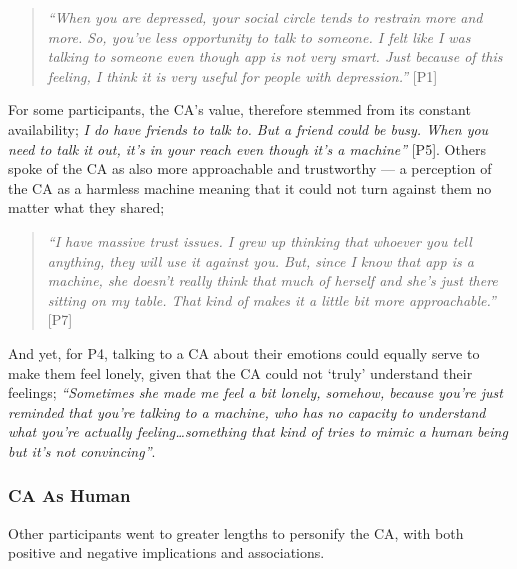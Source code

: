                \begin{quote}
                \vspace{2mm}
                    \textit{``When you are depressed, your social circle tends to restrain more and more. So, you’ve less opportunity to talk to someone. I felt like I was talking to someone even though \acl{app} is not very smart. Just because of this feeling, I think it is very useful for people with depression.''} [P1]
                \vspace{2mm}
                \end{quote} 
            
            For some participants, the \ac{CA}'s value, therefore stemmed from its constant availability; \textit{I do have friends to talk to. But a friend could be busy. When you need to talk it out, it’s in your reach even though it’s a machine'' } [P5]. Others spoke of the \ac{CA} as also more approachable and trustworthy --- a perception of the \ac{CA} as a harmless machine meaning that it could not turn against them no matter what they shared;
            
                \begin{quote}
                \vspace{2mm}
                    \textit{``I have massive trust issues. I grew up thinking that whoever you tell anything, they will use it against you. But, since I know that \acl{app} is a machine, she doesn't really think that much of herself and she's just there sitting on my table. That kind of makes it a little bit more approachable.''} [P7]
                \vspace{2mm}
                \end{quote} 

            And yet, for P4, talking to a \ac{CA} about their emotions could equally serve to make them feel lonely, given that the \ac{CA} could not `truly' understand their feelings; \textit{``Sometimes she made me feel a bit lonely, somehow, because you're just reminded that you're talking to a machine, who has no capacity to understand what you're actually feeling\ldots something that kind of tries to mimic a human being but it's not convincing''}.

        \subsubsection{\ac{CA} As Human} %
        
            Other participants went to greater lengths to personify the \ac{CA}, with both positive and negative implications and associations.

